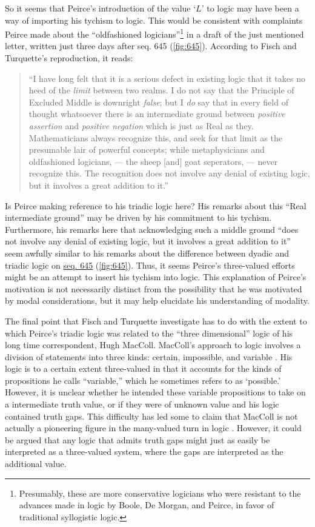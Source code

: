 So it seems that Peirce's introduction of the value `$L$' to logic may have been a way of importing his tychism to logic. This would be consistent with complaints Peirce made about the ``oldfashioned logicians''\footnote{Presumably, these are more conservative logicians who were resistant to the advances made in logic by Boole, De Morgan, and Peirce, in favor of traditional syllogistic logic.} in a draft of the just mentioned letter, written just three days after seq. 645 (\ref{fig:645}). According to Fisch and Turquette's reproduction, it reads:
\begin{quotation} 
\noindent``I have long felt that it is a serious defect in existing logic that it takes no heed of the \textit{limit} between two realms. I do not say that the Principle of Excluded Middle is downright \textit{false}; but I \textit{do} say that in every field of thought whatsoever there is an intermediate ground between \textit{positive assertion} and \textit{positive negation} which is just as Real as they. Mathematicians always recognize this, and seek for that limit as the presumable lair of powerful concepts; while metaphysicians and oldfashioned logicians, --- the sheep [and] goat seperators, --- never recognize this. The recognition does not involve any denial of existing logic, but it involves a great addition to it.''
\end{quotation}
\noindent Is Peirce making reference to his triadic logic here? His remarks about this ``Real intermediate ground'' may be driven by his commitment to his tychism. Furthermore, his remarks here that acknowledging such a middle ground ``does not involve any denial of existing logic, but it involves a great addition to it'' seem awfully similar to his remarks about the difference between dyadic and triadic logic on \href{https://iiif.lib.harvard.edu/manifests/view/drs:15255301$645i}{seq. 645} (\ref{fig:645}). Thus, it seems Peirce's three-valued efforts might be an attempt to insert his tychism into logic. This explanation of Peirce's motivation is not necessarily distinct from the possibility that he was motivated by modal considerations, but it may help elucidate his understanding of modality.

The final point that Fisch and Turquette investigate has to do with the extent to which Peirce's triadic logic was related to the ``three dimensional'' logic of his long time correspondent, Hugh MacColl. MacColl's approach to logic involves a division of statements into three kinds: certain, impossible, and variable \citep{maccoll_symbolic_1906}. His logic is to a certain extent three-valued in that it accounts for the kinds of propositions he calls ``variable,'' which he sometimes refers to as `possible.' However, it is unclear whether he intended these variable propositions to take on a intermediate truth value, or if they were of unknown value and his logic contained truth gaps. This difficulty has led some to claim that MacColl is not actually a pioneering figure in the many-valued turn in logic \citep{conjunction_peter_1998}. However, it could be argued that any logic that admits truth gaps might just as easily be interpreted as a three-valued system, where the gaps are interpreted as the additional value.

